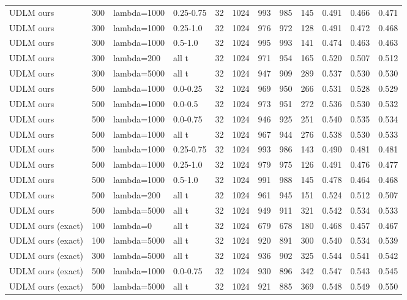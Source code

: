 \begin{tabular}{lllllrrrrrrr}
UDLM ours & 300 & lambda=1000 & 0.25-0.75 & 32 & 1024 & 993 & 985 & 145 & 0.491 & 0.466 & 0.471 \\
UDLM ours & 300 & lambda=1000 & 0.25-1.0 & 32 & 1024 & 976 & 972 & 128 & 0.491 & 0.472 & 0.468 \\
UDLM ours & 300 & lambda=1000 & 0.5-1.0 & 32 & 1024 & 995 & 993 & 141 & 0.474 & 0.463 & 0.463 \\
UDLM ours & 300 & lambda=200 & all t & 32 & 1024 & 971 & 954 & 165 & 0.520 & 0.507 & 0.512 \\
UDLM ours & 300 & lambda=5000 & all t & 32 & 1024 & 947 & 909 & 289 & 0.537 & 0.530 & 0.530 \\
UDLM ours & 500 & lambda=1000 & 0.0-0.25 & 32 & 1024 & 969 & 950 & 266 & 0.531 & 0.528 & 0.529 \\
UDLM ours & 500 & lambda=1000 & 0.0-0.5 & 32 & 1024 & 973 & 951 & 272 & 0.536 & 0.530 & 0.532 \\
UDLM ours & 500 & lambda=1000 & 0.0-0.75 & 32 & 1024 & 946 & 925 & 251 & 0.540 & 0.535 & 0.534 \\
UDLM ours & 500 & lambda=1000 & all t & 32 & 1024 & 967 & 944 & 276 & 0.538 & 0.530 & 0.533 \\
UDLM ours & 500 & lambda=1000 & 0.25-0.75 & 32 & 1024 & 993 & 986 & 143 & 0.490 & 0.481 & 0.481 \\
UDLM ours & 500 & lambda=1000 & 0.25-1.0 & 32 & 1024 & 979 & 975 & 126 & 0.491 & 0.476 & 0.477 \\
UDLM ours & 500 & lambda=1000 & 0.5-1.0 & 32 & 1024 & 991 & 988 & 145 & 0.478 & 0.464 & 0.468 \\
UDLM ours & 500 & lambda=200 & all t & 32 & 1024 & 961 & 945 & 151 & 0.524 & 0.512 & 0.507 \\
UDLM ours & 500 & lambda=5000 & all t & 32 & 1024 & 949 & 911 & 321 & 0.542 & 0.534 & 0.533 \\
UDLM ours (exact) & 100 & lambda=0 & all t & 32 & 1024 & 679 & 678 & 180 & 0.468 & 0.457 & 0.467 \\
UDLM ours (exact) & 100 & lambda=5000 & all t & 32 & 1024 & 920 & 891 & 300 & 0.540 & 0.534 & 0.539 \\
UDLM ours (exact) & 300 & lambda=5000 & all t & 32 & 1024 & 936 & 902 & 325 & 0.544 & 0.541 & 0.542 \\
UDLM ours (exact) & 500 & lambda=1000 & 0.0-0.75 & 32 & 1024 & 930 & 896 & 342 & 0.547 & 0.543 & 0.545 \\
UDLM ours (exact) & 500 & lambda=5000 & all t & 32 & 1024 & 921 & 885 & 369 & 0.548 & 0.549 & 0.550 \\

\end{tabular}
